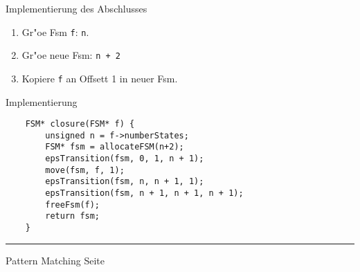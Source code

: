 \begin{slide}{}
\normalsize

\begin{center}
Implementierung des Abschlusses
\end{center}
\vspace*{0.5cm}

\footnotesize
\hspace*{-1cm}

\begin{enumerate}
\item Gr"o\3e Fsm \texttt{f}: \texttt{n}.
\item Gr"o\3e neue Fsm: \texttt{n + 2}
\item Kopiere \texttt{f} an Offsett 1 in neuer Fsm.
\end{enumerate}

Implementierung
\begin{verbatim}
    FSM* closure(FSM* f) {
        unsigned n = f->numberStates;
        FSM* fsm = allocateFSM(n+2);
        epsTransition(fsm, 0, 1, n + 1);
        move(fsm, f, 1);
        epsTransition(fsm, n, n + 1, 1);
        epsTransition(fsm, n + 1, n + 1, n + 1);
        freeFsm(f);
        return fsm;
    }
\end{verbatim}


\vspace*{\fill}
\tiny \addtocounter{mypage}{1}
\rule{17cm}{1mm}
Pattern Matching \hspace*{\fill} Seite 
\end{slide}


